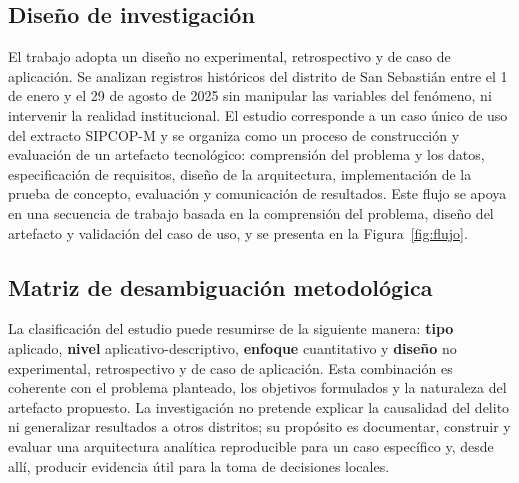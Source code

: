 \subsection{Diseño de investigación}

El trabajo adopta un diseño no experimental, retrospectivo y de caso de aplicación. Se analizan registros históricos del distrito de San Sebastián entre el 1 de enero y el 29 de agosto de 2025 sin manipular las variables del fenómeno, ni intervenir la realidad institucional. El estudio corresponde a un caso único de uso del extracto SIPCOP-M y se organiza como un proceso de construcción y evaluación de un artefacto tecnológico: comprensión del problema y los datos, especificación de requisitos, diseño de la arquitectura, implementación de la prueba de concepto, evaluación y comunicación de resultados. Este flujo se apoya en una secuencia de trabajo basada en la comprensión del problema, diseño del artefacto y validación del caso de uso, y se presenta en la Figura~\ref{fig:flujo}.

\subsection{Matriz de desambiguación metodológica}

La clasificación del estudio puede resumirse de la siguiente manera: \textbf{tipo} aplicado, \textbf{nivel} aplicativo-descriptivo, \textbf{enfoque} cuantitativo y \textbf{diseño} no experimental, retrospectivo y de caso de aplicación. Esta combinación es coherente con el problema planteado, los objetivos formulados y la naturaleza del artefacto propuesto. La investigación no pretende explicar la causalidad del delito ni generalizar resultados a otros distritos; su propósito es documentar, construir y evaluar una arquitectura analítica reproducible para un caso específico y, desde allí, producir evidencia útil para la toma de decisiones locales.

